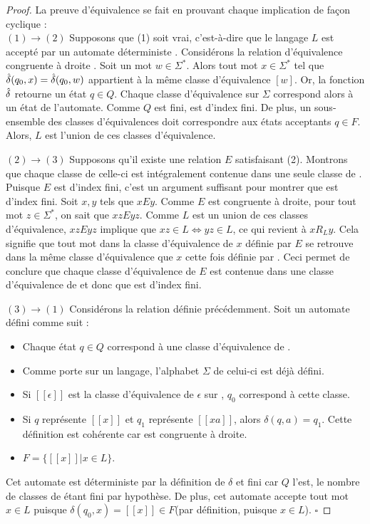 	\begin{proof}\label{proof:mn}
		La preuve d'équivalence se fait en prouvant chaque implication de façon cyclique :\\

		$(1)\rightarrow(2)$ Supposons que (1) soit vrai, c'est-à-dire que le langage $L$ est accepté par un automate déterministe \automaton. Considérons la relation d'équivalence congruente à droite \rb. Soit un mot $w\in\Sigma^*$. Alors tout mot $x\in\Sigma^*$ tel que $\hat{\delta}(q_0,x)=\hat{\delta}(q_0,w)$ appartient à la même classe d'équivalence $[w]$. Or, la fonction $\hat{\delta}$ retourne un état $q\in Q$. Chaque classe d'équivalence sur $\Sigma$ correspond alors à un état de l'automate. Comme $Q$ est fini, \rb est d'index fini. De plus, un sous-ensemble des classes d'équivalences doit correspondre aux états acceptants $q\in F$. Alors, $L$ est l'union de ces classes d'équivalence.

		$(2)\rightarrow(3)$ Supposons qu'il existe une relation $E$ satisfaisant (2). Montrons que chaque classe de celle-ci est intégralement contenue dans une seule classe de \rl. Puisque $E$ est d'index fini, c'est un argument suffisant pour montrer que \rl est d'index fini. Soit $x,y$ tels que $xEy$. Comme $E$ est congruente à droite, pour tout mot $z \in \Sigma^*$, on sait que $xzEyz$. Comme $L$ est un union de ces classes d'équivalence, $xzEyz$ implique que $xz \in L \Leftrightarrow yz \in L$, ce qui revient à $xR_Ly$. Cela signifie que tout mot dans la classe d'équivalence de $x$ définie par $E$ se retrouve dans la même classe d'équivalence que $x$ cette fois définie par \rl. Ceci permet de conclure que chaque classe d'équivalence de $E$ est contenue dans une classe d'équivalence de \rl et donc que \rl est d'index fini.

		$(3)\rightarrow(1)$ Considérons la relation \rl définie précédemment. Soit un automate \automaton défini comme suit :
		\begin{itemize}
			\item Chaque état $q\in Q$ correspond à une classe d'équivalence de \rl.
			\item Comme \rl porte sur un langage, l'alphabet $\Sigma$ de celui-ci est déjà défini.
			\item Si $[[\epsilon]]$ est la classe d'équivalence de $\epsilon$ sur \rl, $q_0$ correspond à cette classe.
			\item Si $q$ représente $[[x]]$ et $q_1$ représente $[[xa]]$, alors $\delta(q,a)=q_1$. Cette définition est cohérente car \rl est congruente à droite.
			\item $F = \{[[x]]|x \in L\}$.
		\end{itemize}
		Cet automate est déterministe par la définition de $\delta$ et fini car $Q$ l'est, le nombre de classes de \rl étant fini par hypothèse. De plus, cet automate accepte tout mot $x\in L$ puisque $\delta(q_0,x)=[[x]]\in F$(par définition, puisque $x\in L$).
		\hfill$\square$
	\end{proof}


